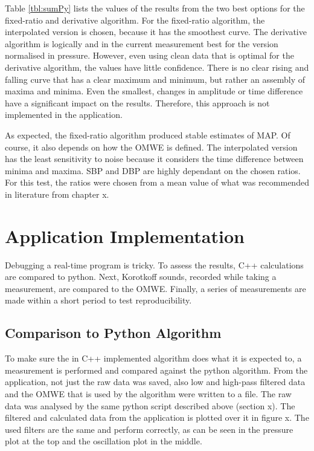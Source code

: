 Table \ref{tbl:sumPy} lists the values of the results from the two best options for the fixed-ratio and derivative algorithm. For the fixed-ratio algorithm, the interpolated version is chosen, because it has the smoothest curve. The derivative algorithm is logically and in the current measurement best for the version normalised in pressure. However, even using clean data that is optimal for the derivative algorithm, the values have little confidence. There is no clear rising and falling curve that has a clear maximum and minimum, but rather an assembly of maxima and minima. Even the smallest, changes in amplitude or time difference have a significant impact on the results. Therefore, this approach is not implemented in the application.

As expected, the fixed-ratio algorithm produced stable estimates of MAP. Of course, it also depends on how the OMWE is defined. The interpolated version has the least sensitivity to noise because it considers the time difference between minima and maxima. SBP and DBP are highly dependant on the chosen ratios. For this test, the ratios were chosen from a mean value of what was recommended in literature from chapter x.



\section{Application Implementation}
Debugging a real-time program is tricky. To assess the results,  C++ calculations are compared to python. Next, Korotkoff sounds, recorded while taking a measurement, are compared to the OMWE. Finally, a series of measurements are made within a short period to test reproducibility.

\subsection{Comparison to Python Algorithm}
To make sure the in C++ implemented algorithm does what it is expected to, a measurement is performed and compared against the python algorithm. From the application, not just the raw data was saved, also low and high-pass filtered data and the OMWE that is used by the algorithm were written to a file. The raw data was analysed by the same python script described above (section x). The filtered and calculated data from the application is plotted over it in figure x. The used filters are the same and perform correctly, as can be seen in the pressure plot at the top and the oscillation plot in the middle. 

